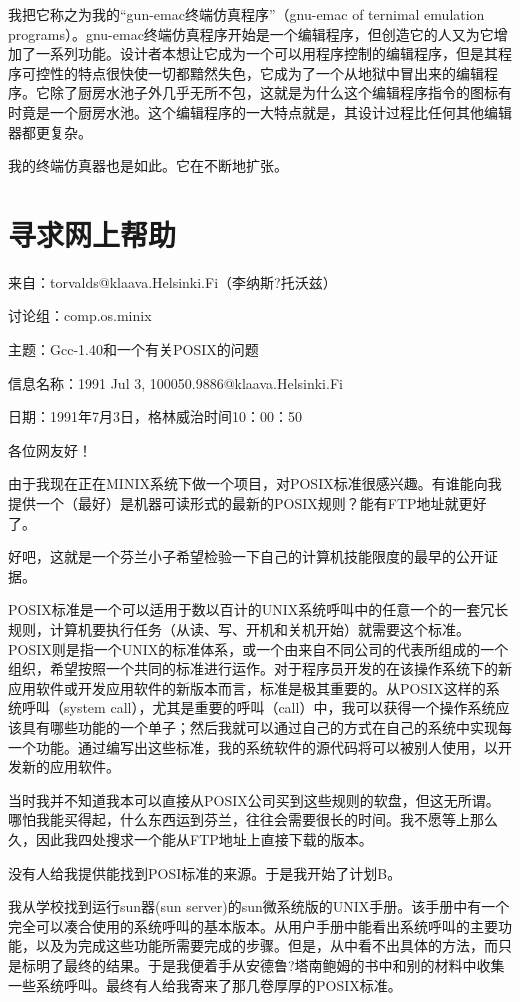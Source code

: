 我把它称之为我的“gun-emac终端仿真程序”（gnu-emac of ternimal emulation programs）。gnu-emac终端仿真程序开始是一个编辑程序，但创造它的人又为它增加了一系列功能。设计者本想让它成为一个可以用程序控制的编辑程序，但是其程序可控性的特点很快使一切都黯然失色，它成为了一个从地狱中冒出来的编辑程序。它除了厨房水池子外几乎无所不包，这就是为什么这个编辑程序指令的图标有时竟是一个厨房水池。这个编辑程序的一大特点就是，其设计过程比任何其他编辑器都更复杂。

我的终端仿真器也是如此。它在不断地扩张。

 
\section{寻求网上帮助}

来自：torvalds@klaava.Helsinki.Fi（李纳斯?托沃兹）

讨论组：comp.os.minix

主题：Gcc-1.40和一个有关POSIX的问题

信息名称：1991 Jul 3, 100050.9886@klaava.Helsinki.Fi

日期：1991年7月3日，格林威治时间10：00：50

各位网友好！

由于我现在正在MINIX系统下做一个项目，对POSIX标准很感兴趣。有谁能向我提供一个（最好）是机器可读形式的最新的POSIX规则？能有FTP地址就更好了。

 

好吧，这就是一个芬兰小子希望检验一下自己的计算机技能限度的最早的公开证据。

POSIX标准是一个可以适用于数以百计的UNIX系统呼叫中的任意一个的一套冗长规则，计算机要执行任务（从读、写、开机和关机开始）就需要这个标准。POSIX则是指一个UNIX的标准体系，或一个由来自不同公司的代表所组成的一个组织，希望按照一个共同的标准进行运作。对于程序员开发的在该操作系统下的新应用软件或开发应用软件的新版本而言，标准是极其重要的。从POSIX这样的系统呼叫（system call），尤其是重要的呼叫（call）中，我可以获得一个操作系统应该具有哪些功能的一个单子；然后我就可以通过自己的方式在自己的系统中实现每一个功能。通过编写出这些标准，我的系统软件的源代码将可以被别人使用，以开发新的应用软件。

当时我并不知道我本可以直接从POSIX公司买到这些规则的软盘，但这无所谓。哪怕我能买得起，什么东西运到芬兰，往往会需要很长的时间。我不愿等上那么久，因此我四处搜求一个能从FTP地址上直接下载的版本。

没有人给我提供能找到POSI标准的来源。于是我开始了计划B。

我从学校找到运行sun器(sun server)的sun微系统版的UNIX手册。该手册中有一个完全可以凑合使用的系统呼叫的基本版本。从用户手册中能看出系统呼叫的主要功能，以及为完成这些功能所需要完成的步骤。但是，从中看不出具体的方法，而只是标明了最终的结果。于是我便着手从安德鲁?塔南鲍姆的书中和别的材料中收集一些系统呼叫。最终有人给我寄来了那几卷厚厚的POSIX标准。

